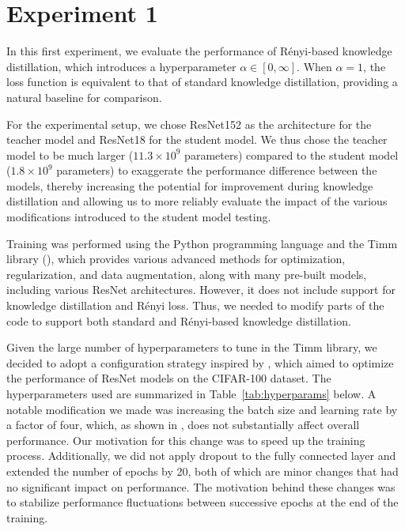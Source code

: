 \section{Experiment 1}

In this first experiment, we evaluate the performance of Rényi-based knowledge distillation, which introduces a hyperparameter $\alpha \in [0, \infty]$. When $\alpha = 1$, the loss function is equivalent to that of standard knowledge distillation, providing a natural baseline for comparison.

For the experimental setup, we chose ResNet152 as the architecture for the teacher model and ResNet18 for the student model. We thus chose the teacher model to be much larger ($11.3 \times 10^9$ parameters) compared to the student model ($1.8 \times 10^9$ parameters) to exaggerate the performance difference between the models, thereby increasing the potential for improvement during knowledge distillation and allowing us to more reliably evaluate the impact of the various modifications introduced to the student model testing.

Training was performed using the Python programming language and the Timm library (\cite{Wightman2019}), which provides various advanced methods for optimization, regularization, and data augmentation, along with many pre-built models, including various ResNet architectures. However, it does not include support for knowledge distillation and Rényi loss. Thus, we needed to modify parts of the code to support both standard and Rényi-based knowledge distillation.

Given the large number of hyperparameters to tune in the Timm library, we decided to adopt a configuration strategy inspired by \cite{AbbasLee2021}, which aimed to optimize the performance of ResNet models on the CIFAR-100 dataset. The hyperparameters used are summarized in Table~\ref{tab:hyperparams} below. A notable modification we made was increasing the batch size and learning rate by a factor of four, which, as shown in \cite{Goyal2017}, does not substantially affect overall performance. Our motivation for this change was to speed up the training process. Additionally, we did not apply dropout to the fully connected layer and extended the number of epochs by 20, both of which are minor changes that had no significant impact on performance. The motivation behind these changes was to stabilize performance fluctuations between successive epochs at the end of the training.

